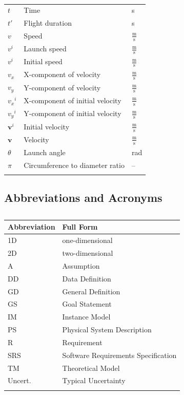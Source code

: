 \documentclass[12pt]{article}
\begin{document}
\begin{longtabu}{l X[l] l}
\\
$t$ & Time & s
\\
$t'$ & Flight duration & s
\\
$v$ & Speed & $\frac{\text{m}}{\text{s}}$
\\
${v^{i}}$ & Launch speed & $\frac{\text{m}}{\text{s}}$
\\
${v^{i}}$ & Initial speed & $\frac{\text{m}}{\text{s}}$
\\
${v_{x}}$ & X-component of velocity & $\frac{\text{m}}{\text{s}}$
\\
${v_{y}}$ & Y-component of velocity & $\frac{\text{m}}{\text{s}}$
\\
${{v_{x}}^{i}}$ & X-component of initial velocity & $\frac{\text{m}}{\text{s}}$
\\
${{v_{y}}^{i}}$ & Y-component of initial velocity & $\frac{\text{m}}{\text{s}}$
\\
${\mathbf{v}^{i}}$ & Initial velocity & $\frac{\text{m}}{\text{s}}$
\\
$\mathbf{v}$ & Velocity & $\frac{\text{m}}{\text{s}}$
\\
$θ$ & Launch angle & rad
\\
$π$ & Circumference to diameter ratio & --
\\
\bottomrule
\caption{}
\label{Table:ToS}
\end{longtabu}
\subsection{Abbreviations and Acronyms}
\label{Sec:TAbbAcc}
\begin{longtable}{l l}
\toprule
Abbreviation & Full Form
\\
\midrule
\endhead
1D & one-dimensional
\\
2D & two-dimensional
\\
A & Assumption
\\
DD & Data Definition
\\
GD & General Definition
\\
GS & Goal Statement
\\
IM & Instance Model
\\
PS & Physical System Description
\\
R & Requirement
\\
SRS & Software Requirements Specification
\\
TM & Theoretical Model
\\
Uncert. & Typical Uncertainty
\\
\bottomrule
\caption{}
\label{Table:TAbbAcc}
\end{longtable}
\end{document}
